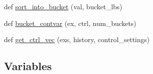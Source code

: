 \begin{DoxyCompactItemize}
\item 
def \hyperlink{namespaceprojects_1_1controllable__dialogue_1_1controllable__seq2seq_1_1controls_a10bd268a01b2a8886d5af4358cd5e922}{sort\+\_\+into\+\_\+bucket} (val, bucket\+\_\+lbs)
\item 
def \hyperlink{namespaceprojects_1_1controllable__dialogue_1_1controllable__seq2seq_1_1controls_a60657d8955080feedb6dcbb084e2ae13}{bucket\+\_\+contvar} (ex, ctrl, num\+\_\+buckets)
\item 
def \hyperlink{namespaceprojects_1_1controllable__dialogue_1_1controllable__seq2seq_1_1controls_a3057eb90e6aeff3fbf2c89c7e003aea0}{get\+\_\+ctrl\+\_\+vec} (exs, history, control\+\_\+settings)
\end{DoxyCompactItemize}
\subsection*{Variables}
